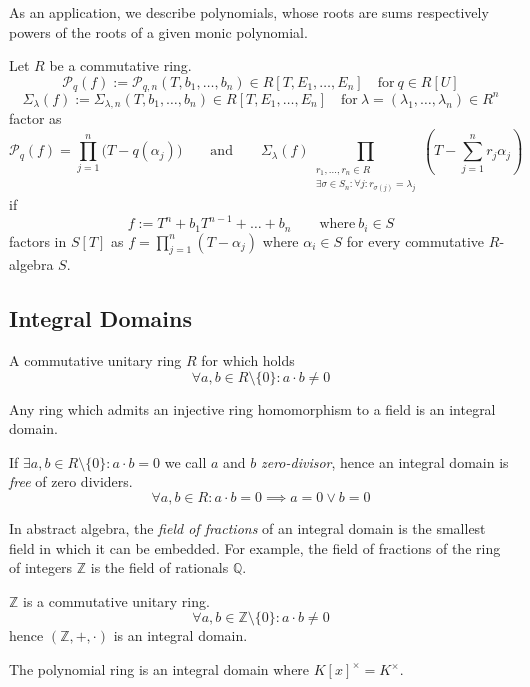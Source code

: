 As an application, we describe polynomials, whose roots are sums respectively powers of the roots of a given monic polynomial.
\begin{proposition}
   Let \(R\) be a commutative ring.
   \[\mathscr{P}_q(f) := \mathscr{P}_{q,n}(T, b_1, \ldots, b_n) \in R[T, E_1, \ldots, E_n] \quad\text{for}~q \in R[U]\]
   \[\Sigma_{\lambda}(f) := \Sigma_{\lambda, n}(T, b_1, \ldots, b_n) \in R[T, E_1, \ldots, E_n] \quad\text{for}~\lambda=(\lambda_1, \ldots, \lambda_n) \in R^n\]
   factor as
   \[\mathscr{P}_q(f) = \prod_{j=1}^n\big(T - q(\alpha_j)\big) \qquad\text{and}\qquad \Sigma_{\lambda}(f) \prod_{\substack{r_1, \ldots, r_n \in R\\\exists \sigma \in S_n: \forall j: r_{\sigma(j)} = \lambda_j}} \left(T - \sum_{j=1}^n r_j\alpha_j\right)\]
   if
   \[f := T^n + b_1T^{n-1} + \ldots + b_n \qquad\text{where}~b_i\in S\]
   factors in \(S[T]\) as \(f = \prod_{j=1}^n (T - \alpha_j)\) where \(\alpha_i \in S\) for every commutative \(R\)-algebra \(S\).
\end{proposition}

\subsection{Integral Domains}
\begin{definition}\label{def:integral_domain}
   A commutative unitary ring \(R\) for which holds
   \[\forall a, b \in R \setminus \{0\}: a \cdot b \neq 0\]
\end{definition}
\begin{remark}
   Any ring which admits an injective ring homomorphism to a field is an integral domain.
\end{remark}
\begin{remark}
   If \(\exists a, b \in R \setminus \{0\}: a \cdot b = 0\) we call \(a\) and \(b\) \emph{zero-divisor}, hence an integral domain is \emph{free} of zero dividers.
   \[\forall a, b \in R: a \cdot b = 0 \implies a = 0 \lor b = 0\]
\end{remark}
\begin{remark}
   In abstract algebra, the \emph{field of fractions} of an integral domain is the smallest field in which it can be embedded.
   For example, the field of fractions of the ring of integers \(\mathbb{Z}\) is the field of rationals \(\mathbb{Q}\).
\end{remark}
\begin{example}
   \(\mathbb{Z}\) is a commutative unitary ring.
   \[\forall a, b \in \mathbb{Z} \setminus \{0\}: a \cdot b \neq 0\]
   hence \((\mathbb{Z}, +, \cdot)\) is an integral domain.
\end{example}
\begin{example}[Polynomials]
   The polynomial ring is an integral domain where \(K[x]^{\times} = K^{\times}\).
\end{example}

